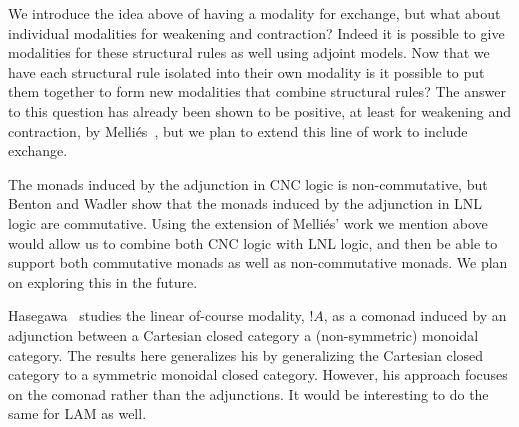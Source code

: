 We introduce the idea above of having a modality for exchange, but
what about individual modalities for weakening and contraction?
Indeed it is possible to give modalities for these structural rules as
well using adjoint models.  Now that we have each structural rule
isolated into their own modality is it possible to put them together
to form new modalities that combine structural rules?  The answer to
this question has already been shown to be positive, at least for
weakening and contraction, by Melli{\'e}s~\cite{Mellies:2004}, but we
plan to extend this line of work to include exchange.

The monads induced by the adjunction in CNC logic is non-commutative,
but Benton and Wadler show that the monads induced by the adjunction
in LNL logic \cite{Benton:1996} are commutative.  Using the extension
of Melli{\'e}s' work we mention above would allow us to combine both
CNC logic with LNL logic, and then be able to support both commutative
monads as well as non-commutative monads.  We plan on exploring this
in the future.

Hasegawa~\cite{EPTCS238.6} studies the linear of-course modality,
$!A$, as a comonad induced by an adjunction between a Cartesian closed
category a (non-symmetric) monoidal category.  The results here
generalizes his by generalizing the Cartesian closed category to a
symmetric monoidal closed category.  However, his approach focuses on
the comonad rather than the adjunctions.  It would be interesting to
do the same for LAM as well.
